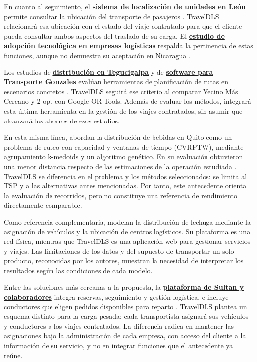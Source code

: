 En cuanto al seguimiento, el \textbf{\hyperref[ant:garcia]{sistema de localización de unidades en León}} permite consultar la ubicación del transporte de pasajeros \parencite[pp.~3, 7]{garcia2022desarrollo}. TravelDLS relacionará esa ubicación con el estado del viaje contratado para que el cliente pueda consultar ambos aspectos del traslado de su carga. El \textbf{\hyperref[ant:pauzuoliene]{estudio de adopción tecnológica en empresas logísticas}} respalda la pertinencia de estas funciones, aunque no demuestra su aceptación en Nicaragua \parencite[pp.~988--989]{pauzuoliene2024smart}.

Los estudios de \textbf{\hyperref[ant:aguilar]{distribución en Tegucigalpa}} y de \textbf{\hyperref[ant:hernandez]{software para Transporte Gonzales}} evalúan herramientas de planificación de rutas en escenarios concretos \parencites[p.~56]{aguilar2022optimizacion}[p.~111]{hernandez2024evaluacion}. TravelDLS seguirá ese criterio al comparar Vecino Más Cercano y 2-opt con Google OR-Tools. Además de evaluar los métodos, integrará esta última herramienta en la gestión de los viajes contratados, sin asumir que alcanzará los ahorros de esos estudios.

En esta misma línea, \textcite[pp.~15--17, 28--31]{martinez2020ruteo} abordan la distribución de bebidas en Quito como un problema de ruteo con capacidad y ventanas de tiempo (CVRPTW), mediante agrupamiento k-medoids y un algoritmo genético. En su evaluación obtuvieron una menor distancia respecto de las estimaciones de la operación estudiada \parencite[p.~37]{martinez2020ruteo}. TravelDLS se diferencia en el problema y los métodos seleccionados: se limita al TSP y a las alternativas antes mencionadas. Por tanto, este antecedente orienta la evaluación de recorridos, pero no constituye una referencia de rendimiento directamente comparable.

Como referencia complementaria, \textcite[pp.~20--24]{alvarez2016plataforma} modelan la distribución de lechuga mediante la asignación de vehículos y la ubicación de centros logísticos. Su plataforma es una red física, mientras que TravelDLS es una aplicación web para gestionar servicios y viajes. Las limitaciones de los datos y del supuesto de transportar un solo producto, reconocidas por los autores, muestran la necesidad de interpretar los resultados según las condiciones de cada modelo.

Entre las soluciones más cercanas a la propuesta, la \textbf{\hyperref[ant:sultan]{plataforma de Sultan y colaboradores}} integra reservas, seguimiento y gestión logística, e incluye conductores que eligen pedidos disponibles para reparto \parencite[pp.~1--4]{sultan2022real}. TravelDLS plantea un esquema distinto para la carga pesada: cada transportista asignará sus vehículos y conductores a los viajes contratados. La diferencia radica en mantener las asignaciones bajo la administración de cada empresa, con acceso del cliente a la información de su servicio, y no en integrar funciones que el antecedente ya reúne.

